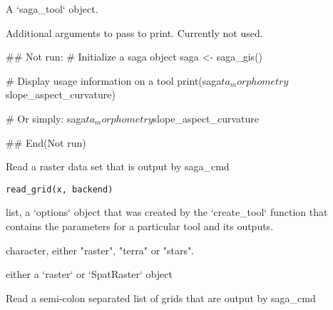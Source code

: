 \documentclass[a4paper]{book}
\begin{document}
%
\begin{Arguments}
\begin{ldescription}
\item[\code{x}] A `saga\_tool` object.

\item[\code{...}] Additional arguments to pass to print. Currently not used.
\end{ldescription}
\end{Arguments}
%
\begin{Examples}
\begin{ExampleCode}
## Not run: 
# Initialize a saga object
saga <- saga_gis()

# Display usage information on a tool
print(saga$ta_morphometry$slope_aspect_curvature)

# Or simply:
saga$ta_morphometry$slope_aspect_curvature

## End(Not run)
\end{ExampleCode}
\end{Examples}
%
\begin{Description}
Read a raster data set that is output by saga\_cmd
\end{Description}
%
\begin{Usage}
\begin{verbatim}
read_grid(x, backend)
\end{verbatim}
\end{Usage}
%
\begin{Arguments}
\begin{ldescription}
\item[\code{x}] list, a `options` object that was created by the `create\_tool`
function that contains the parameters for a particular tool and its
outputs.

\item[\code{backend}] character, either "raster", "terra" or "stars".
\end{ldescription}
\end{Arguments}
%
\begin{Value}
either a `raster` or `SpatRaster` object
\end{Value}
%
\begin{Description}
Read a semi-colon separated list of grids that are output by saga\_cmd
\end{Description}
\end{document}

